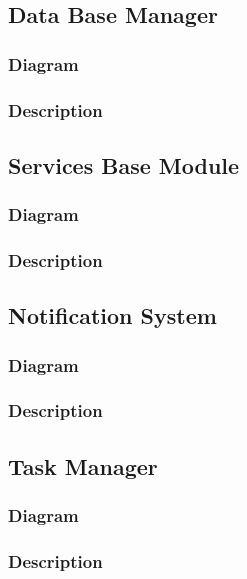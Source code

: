 \documentclass{article}
\begin{document}
\subsection{Data Base Manager} %

\subsubsection{Diagram}

\subsubsection{Description}

\subsection{Services Base Module} %

\subsubsection{Diagram}

\subsubsection{Description}

\subsection{Notification System} %

\subsubsection{Diagram}

\subsubsection{Description}

\subsection{Task Manager} %

\subsubsection{Diagram}

\subsubsection{Description}
\end{document}

